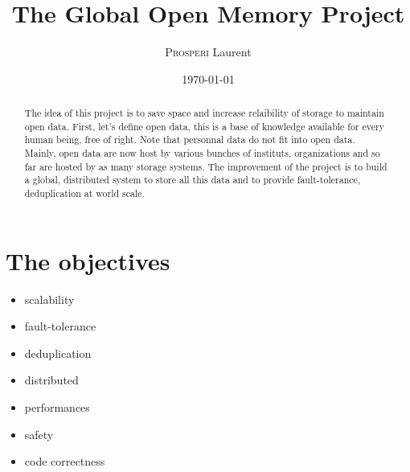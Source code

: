 \documentclass[a4paper,10pt]{article}
\title{The Global Open Memory Project}
\author{\textsc{Prosperi} Laurent}
\date\today %
\begin{document}
\maketitle


\begin{abstract}
   The idea of this project is to save space and increase relaibility of storage to maintain open data. First, let's define 
   open data, this is a base of knowledge available for every human being, free of right. Note that  personnal data do not fit 
   into open data.
   \\
   
   Mainly, open data are now host by various bunches of instituts, organizations and so far are hosted by as many storage systems. 
   The improvement of the project is to build a global, distributed system to store all this data and to provide fault-tolerance, deduplication at 
   world scale.
\end{abstract}

\section{The objectives}
\begin{itemize}
 \item scalability
 \item fault-tolerance
 \item deduplication
 \item distributed
 \item performances
 \item safety
 \item code correctness
\end{itemize}
\end{document}
